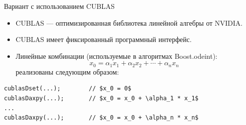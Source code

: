 \documentclass[@BEAMER_OPTIONS@]{beamer}
\begin{document}

\begin{frame}[fragile]{Вариант с использованием CUBLAS}
    \begin{itemize}
        \item CUBLAS --- оптимизированная библиотека линейной алгебры от
            NVIDIA.
        \item CUBLAS имеет фиксированный программный интерфейс.
        \item Линейные комбинации (используемые в алгоритмах Boost.odeint):
            \begin{equation*}
                x_0 = \alpha_1 x_1 + \alpha_2 x_2 + \cdots + \alpha_n x_n
            \end{equation*}
            реализованы следующим образом:
    \end{itemize}
    \begin{exampleblock}{}
        \begin{lstlisting}[numbers=none,texcl=true]
cublasDset(...);        // $x_0 = 0$
cublasDaxpy(...);       // $x_0 = x_0 + \alpha_1 * x_1$
...
cublasDaxpy(...);       // $x_0 = x_0 + \alpha_n * x_n$
        \end{lstlisting}
    \end{exampleblock}
\end{frame}
\end{document}
